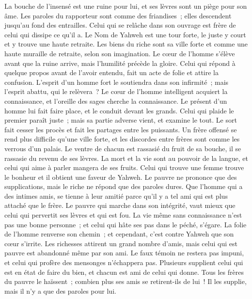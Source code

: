 \begin{multicols}{2}
La bouche de l'insensé est une ruine pour lui, et ses lèvres sont un piège pour son âme.
Les paroles du rapporteur sont comme des friandises~; elles descendent jusqu'au fond des entrailles. 
Celui qui se relâche dans son ouvrage est frère de celui qui dissipe ce qu'il a.
Le Nom de Yahweh est une tour forte, le juste y court et y trouve une haute retraite.
Les biens du riche sont sa ville forte et comme une haute muraille de retraite, selon son imagination.
Le cœur de l'homme s'élève avant que la ruine arrive, mais l'humilité précède la gloire.
Celui qui répond à quelque propos avant de l'avoir entendu, fait un acte de folie et attire la confusion.
L'esprit d'un homme fort le soutiendra dans son infirmité~; mais l'esprit abattu, qui le relèvera~?
Le cœur de l'homme intelligent acquiert la connaissance, et l'oreille des sages cherche la connaissance.
Le présent d'un homme lui fait faire place, et le conduit devant les grands.
Celui qui plaide le premier paraît juste~; mais sa partie adverse vient, et examine le tout.
Le sort fait cesser les procès et fait les partages entre les puissants.
Un frère offensé se rend plus difficile qu'une ville forte, et les discordes entre frères sont comme les verrous d'un palais.
Le ventre de chacun est rassasié du fruit de sa bouche, il se rassasie du revenu de ses lèvres.
La mort et la vie sont au pouvoir de la langue, et celui qui aime à parler mangera de ses fruits.
Celui qui trouve une femme trouve le bonheur et il obtient une faveur de Yahweh.
Le pauvre ne prononce que des supplications, mais le riche ne répond que des paroles dures.
Que l'homme qui a des intimes amis, se tienne à leur amitié parce qu'il y a tel ami qui est plus attaché que le frère.
\VerseOne{}Le pauvre qui marche dans son intégrité, vaut mieux que celui qui pervertit ses lèvres et qui est fou.
La vie même sans connaissance n'est pas une bonne personne~; et celui qui hâte ses pas dans le péché, s'égare.
La folie de l'homme renverse son chemin~; et cependant, c'est contre Yahweh que son cœur s'irrite.
Les richesses attirent un grand nombre d'amis, mais celui qui est pauvre est abandonné même par son ami.
Le faux témoin ne restera pas impuni, et celui qui profère des mensonges n'échappera pas.
Plusieurs supplient celui qui est en état de faire du bien, et chacun est ami de celui qui donne.
Tous les frères du pauvre le haïssent~; combien plus ses amis se retirent-ils de lui~! Il les supplie, mais il n'y a que des paroles pour lui.

\end{multicols}

